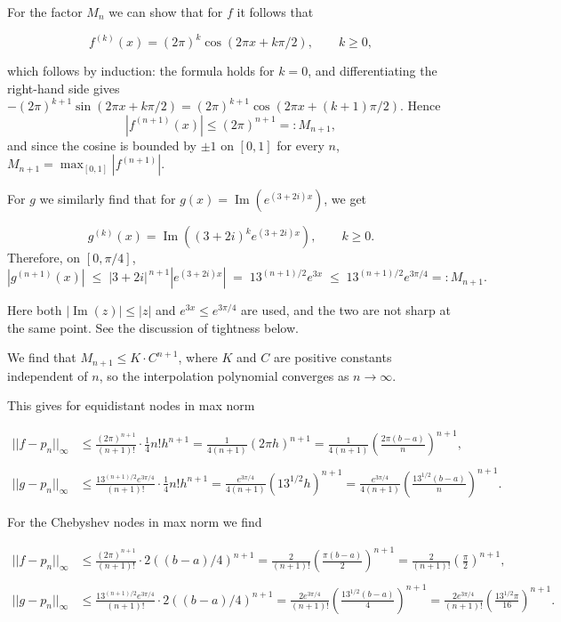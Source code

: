 \documentclass{article}
\begin{document}
\vspace{5mm}
For the factor $M_n$ we can show that for $f$ it follows that

\[
  f^{(k)}(x) = (2\pi)^k \cos\!\left(2\pi x + k\pi/2\right), \qquad k \ge 0,
\]

which follows by induction: the formula holds for $k = 0$, and differentiating
the right-hand side gives $-(2\pi)^{k+1}\sin(2\pi x + k\pi/2)
= (2\pi)^{k+1}\cos(2\pi x + (k+1)\pi/2)$. Hence
\[
  |f^{(n+1)}(x)| \le (2\pi)^{n+1} =: M_{n+1},
\]
and since the cosine is bounded by $\pm 1$ on $[0,1]$ for every $n$, \ $M_{n+1} = \max_{[0,1]}|f^{(n+1)}|$.

\vspace{5mm}
For $g$ we similarly find that for $g(x) = \operatorname{Im}\!\left(e^{(3+2i)x}\right)$, we get

\[
  g^{(k)}(x) = \operatorname{Im}\!\left((3+2i)^k e^{(3+2i)x}\right), \qquad k \ge 0.
\]
Therefore, on $[0,\pi/4]$,
\[
  |g^{(n+1)}(x)|
  \;\le\; |3+2i|^{\,n+1}\left|e^{(3+2i)x}\right|
  \;=\; 13^{(n+1)/2}e^{3x}
  \;\le\; 13^{(n+1)/2}e^{3\pi/4} =: M_{n+1}.
\]

Here both $|\operatorname{Im}(z)| \le |z|$ and $e^{3x} \le e^{ 3\pi/4}$ are used, and the two are not sharp at the
same point. See the discussion of tightness below.

\vspace{5mm}
We find that $M_{n+1} \le K \cdot C^{n+1}$, where $K$ and $C$ are positive constants independent of
$n$, so the interpolation polynomial converges as $n \to \infty$.

\vspace{5mm}
This gives for equidistant nodes in max norm

\begin{align*}
    ||f - p_n||_{\infty} &\le \frac{(2\pi)^{n+1}}{(n+1)!} \cdot \frac{1}{4} n! h^{n+1} = \frac{1}{4(n+1)} (2\pi h)^{n+1} = \frac{1}{4(n+1)} \left(\frac{2\pi(b-a)}{n}\right)^{n+1}, \\\\
    ||g - p_n||_{\infty} &\le \frac{13^{(n+1)/2} e^{3\pi/4}}{(n+1)!} \cdot \frac{1}{4} n! h^{n+1} = \frac{e^{3\pi/4}}{4(n+1)} (13^{1/2} h)^{n+1} = \frac{e^{3\pi/4}}{4(n+1)} \left(\frac{13^{1/2}(b-a)}{n}\right)^{n+1}.
\end{align*}

\vspace{5mm}
For the Chebyshev nodes in max norm we find

\begin{align*}
    ||f - p_n||_{\infty} &\le \frac{(2\pi)^{n+1}}{(n+1)!} \cdot 2 ((b-a)/4)^{n+1} = \frac{2}{(n+1)!} \left(\frac{\pi (b-a)}{2}\right)^{n+1} = \frac{2}{(n+1)!} \left(\frac{\pi}{2}\right)^{n+1}, \\\\
    ||g - p_n||_{\infty} &\le \frac{13^{(n+1)/2} e^{3\pi/4}}{(n+1)!} \cdot 2 ((b-a)/4)^{n+1} = \frac{2e^{3\pi/4}}{(n+1)!} \left(\frac{13^{1/2}(b-a)}{4}\right)^{n+1} = \frac{2e^{3\pi/4}}{(n+1)!} \left(\frac{13^{1/2}\pi}{16}\right)^{n+1}.
\end{align*}
\end{document}
